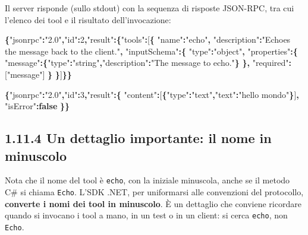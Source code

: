 \documentclass[
  italian,
  10pt,
]{book}
\newenvironment{Shaded}{\begin{snugshade}}{\end{snugshade}}
\newcommand{\DataTypeTok}[1]{\textcolor[rgb]{0.13,0.29,0.53}{#1}}
\newcommand{\DecValTok}[1]{\textcolor[rgb]{0.00,0.00,0.81}{#1}}
\newcommand{\FunctionTok}[1]{\textcolor[rgb]{0.13,0.29,0.53}{\textbf{#1}}}
\newcommand{\KeywordTok}[1]{\textcolor[rgb]{0.13,0.29,0.53}{\textbf{#1}}}
\newcommand{\OtherTok}[1]{\textcolor[rgb]{0.56,0.35,0.01}{#1}}
\newcommand{\StringTok}[1]{\textcolor[rgb]{0.31,0.60,0.02}{#1}}
\begin{document}
Il server risponde (sullo stdout) con la sequenza di risposte JSON-RPC,
tra cui l'elenco dei tool e il risultato dell'invocazione:

\begin{Shaded}
\begin{Highlighting}[]
\FunctionTok{\{}\DataTypeTok{"jsonrpc"}\FunctionTok{:}\StringTok{"2.0"}\FunctionTok{,}\DataTypeTok{"id"}\FunctionTok{:}\DecValTok{2}\FunctionTok{,}\DataTypeTok{"result"}\FunctionTok{:\{}\DataTypeTok{"tools"}\FunctionTok{:}\OtherTok{[}\FunctionTok{\{}
  \DataTypeTok{"name"}\FunctionTok{:}\StringTok{"echo"}\FunctionTok{,}
  \DataTypeTok{"description"}\FunctionTok{:}\StringTok{"Echoes the message back to the client."}\FunctionTok{,}
  \DataTypeTok{"inputSchema"}\FunctionTok{:\{}
    \DataTypeTok{"type"}\FunctionTok{:}\StringTok{"object"}\FunctionTok{,}
    \DataTypeTok{"properties"}\FunctionTok{:\{}
      \DataTypeTok{"message"}\FunctionTok{:\{}\DataTypeTok{"type"}\FunctionTok{:}\StringTok{"string"}\FunctionTok{,}\DataTypeTok{"description"}\FunctionTok{:}\StringTok{"The message to echo."}\FunctionTok{\}}
    \FunctionTok{\},}
    \DataTypeTok{"required"}\FunctionTok{:}\OtherTok{[}\StringTok{"message"}\OtherTok{]}
  \FunctionTok{\}}
\FunctionTok{\}}\OtherTok{]}\FunctionTok{\}\}}
\end{Highlighting}
\end{Shaded}

\begin{Shaded}
\begin{Highlighting}[]
\FunctionTok{\{}\DataTypeTok{"jsonrpc"}\FunctionTok{:}\StringTok{"2.0"}\FunctionTok{,}\DataTypeTok{"id"}\FunctionTok{:}\DecValTok{3}\FunctionTok{,}\DataTypeTok{"result"}\FunctionTok{:\{}
  \DataTypeTok{"content"}\FunctionTok{:}\OtherTok{[}\FunctionTok{\{}\DataTypeTok{"type"}\FunctionTok{:}\StringTok{"text"}\FunctionTok{,}\DataTypeTok{"text"}\FunctionTok{:}\StringTok{"hello mondo"}\FunctionTok{\}}\OtherTok{]}\FunctionTok{,}
  \DataTypeTok{"isError"}\FunctionTok{:}\KeywordTok{false}
\FunctionTok{\}\}}
\end{Highlighting}
\end{Shaded}

\subsection{1.11.4 Un dettaglio importante: il nome in
minuscolo}\label{un-dettaglio-importante-il-nome-in-minuscolo}

Nota che il nome del tool è \texttt{echo}, con la iniziale minuscola,
anche se il metodo C\# si chiama \texttt{Echo}. L'SDK .NET, per
uniformarsi alle convenzioni del protocollo, \textbf{converte i nomi dei
tool in minuscolo}. È un dettaglio che conviene ricordare quando si
invocano i tool a mano, in un test o in un client: si cerca
\texttt{echo}, non \texttt{Echo}.
\end{document}
